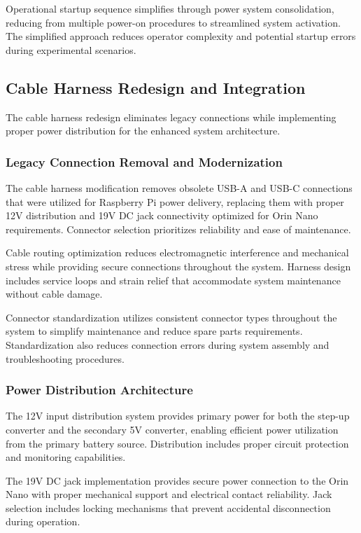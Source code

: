 Operational startup sequence simplifies through power system consolidation, reducing from multiple power-on procedures to streamlined system activation. The simplified approach reduces operator complexity and potential startup errors during experimental scenarios.

\subsection{Cable Harness Redesign and Integration}

The cable harness redesign eliminates legacy connections while implementing proper power distribution for the enhanced system architecture.

\subsubsection{Legacy Connection Removal and Modernization}

The cable harness modification removes obsolete USB-A and USB-C connections that were utilized for Raspberry Pi power delivery, replacing them with proper 12V distribution and 19V DC jack connectivity optimized for Orin Nano requirements. Connector selection prioritizes reliability and ease of maintenance.

Cable routing optimization reduces electromagnetic interference and mechanical stress while providing secure connections throughout the system. Harness design includes service loops and strain relief that accommodate system maintenance without cable damage.

Connector standardization utilizes consistent connector types throughout the system to simplify maintenance and reduce spare parts requirements. Standardization also reduces connection errors during system assembly and troubleshooting procedures.

\subsubsection{Power Distribution Architecture}

The 12V input distribution system provides primary power for both the step-up converter and the secondary 5V converter, enabling efficient power utilization from the primary battery source. Distribution includes proper circuit protection and monitoring capabilities.

The 19V DC jack implementation provides secure power connection to the Orin Nano with proper mechanical support and electrical contact reliability. Jack selection includes locking mechanisms that prevent accidental disconnection during operation.

